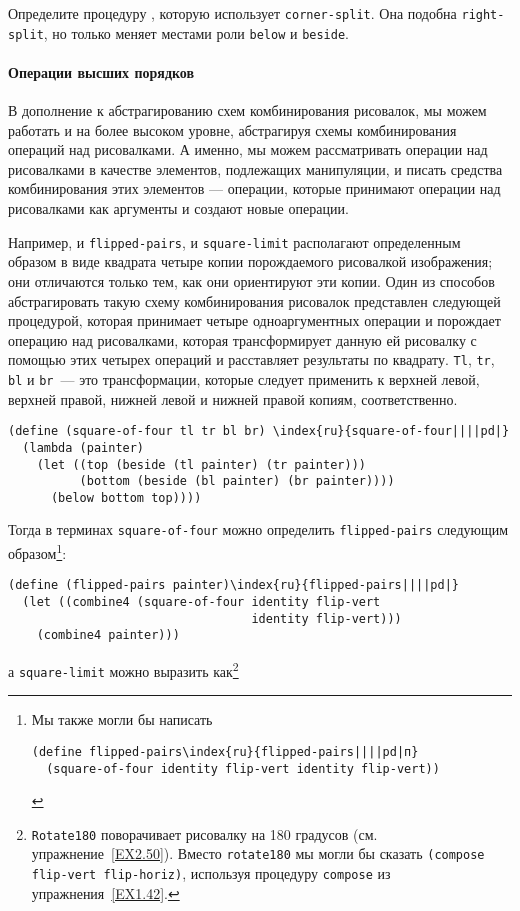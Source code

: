 \begin{exercise}{2.44}\label{EX2.44}%
Определите процедуру , которую
использует {\tt corner-split}.  Она подобна
{\tt right-split}, но только меняет местами роли
{\tt below} и {\tt beside}.
\end{exercise}
\paragraph{Операции высших порядков}


В дополнение к абстрагированию схем комбинирования
рисовалок, мы можем работать и на более высоком уровне, абстрагируя
схемы комбинирования операций над рисовалками. А именно, мы можем
рассматривать операции над рисовалками в качестве элементов, подлежащих
манипуляции, и писать средства комбинирования этих элементов ---
операции, которые принимают операции над рисовалками как аргументы и
создают новые операции.

Например, и {\tt flipped-pairs}, и
{\tt square-limit} располагают определенным образом в виде
квадрата четыре копии порождаемого рисовалкой изображения; они
отличаются только тем, как они ориентируют эти копии. Один из способов 
абстрагировать такую схему комбинирования рисовалок представлен
следующей процедурой, которая принимает четыре одноаргументных
операции и порождает операцию над рисовалками, которая трансформирует
данную ей рисовалку с помощью этих четырех операций и расставляет
результаты по квадрату. {\tt Tl}, {\tt tr},
{\tt bl} и {\tt br}~--- это трансформации, которые
следует применить к верхней левой, верхней правой, нижней левой и
нижней правой копиям, соответственно.

\begin{Verbatim}[fontsize=\small]
(define (square-of-four tl tr bl br) \index{ru}{square-of-four||||pd|}
  (lambda (painter)
    (let ((top (beside (tl painter) (tr painter)))
          (bottom (beside (bl painter) (br painter))))
      (below bottom top))))
\end{Verbatim}


Тогда в терминах {\tt square-of-four} можно определить
{\tt flipped-pairs} следующим образом\footnote{Мы также могли бы написать

\begin{Verbatim}[fontsize=\footnotesize]
(define flipped-pairs\index{ru}{flipped-pairs||||pd|п}
  (square-of-four identity flip-vert identity flip-vert))
\end{Verbatim}
}:%
\begin{Verbatim}[fontsize=\small]
(define (flipped-pairs painter)\index{ru}{flipped-pairs||||pd|}
  (let ((combine4 (square-of-four identity flip-vert
                                  identity flip-vert)))
    (combine4 painter)))
\end{Verbatim}
а {\tt square-limit} можно выразить как\footnote{{\tt Rotate180} поворачивает рисовалку на 180
градусов (см. упражнение~\ref{EX2.50}).  Вместо
{\tt rotate180} мы могли бы сказать {\tt (compose flip-vert
flip-horiz)}, используя процедуру {\tt compose} из
упражнения~\ref{EX1.42}.}

